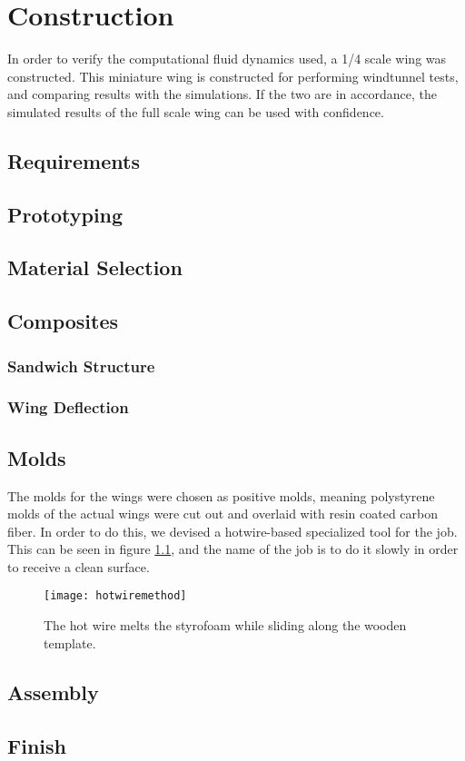 \chapter{Construction}

In order to verify the computational fluid dynamics used, a 1/4 scale wing was constructed. This miniature wing is constructed for performing windtunnel tests, and comparing results with the simulations. If the two are in accordance, the simulated results of the full scale wing can be used with confidence.

\section{Requirements}




\section{Prototyping}

\section{Material Selection}

\section{Composites}
  \subsection{Sandwich Structure}
  \subsection{Wing Deflection}


\section{Molds}

The molds for the wings were chosen as positive molds, meaning polystyrene molds of the actual wings were cut out and overlaid with resin coated carbon fiber. In order to do this, we devised a hotwire-based specialized tool for the job. This can be seen in figure \ref{fig:hotwire}, and the name of the job is to do it slowly in order to receive a clean surface.

\begin{figure}
  \texttt{[image: hotwiremethod]}
  \caption{The hot wire melts the styrofoam while sliding along the wooden template.}
  \label{fig:hotwire}
\end{figure}

\section{Assembly}

\section{Finish}
